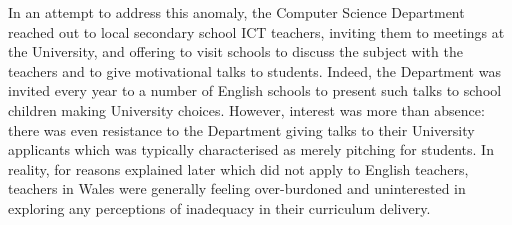 \documentclass{sig-alternate}
\begin{document}
In an attempt to address this anomaly,
the Computer Science Department reached out
to local secondary school ICT teachers,
inviting them to meetings at the University,
and offering to visit schools to discuss
the subject with the teachers and to give
motivational talks to students.
Indeed, the Department was invited every year to
a number of English schools to present such talks
to school children making University choices.
However, interest was more than absence:
there was even resistance to the Department
giving talks to their University applicants
which was typically characterised as merely pitching for students.
In reality, for reasons explained later
which did not apply to English teachers,
teachers in Wales were generally feeling over-burdoned and
uninterested in exploring any perceptions
of inadequacy in their curriculum delivery.
\end{document}
